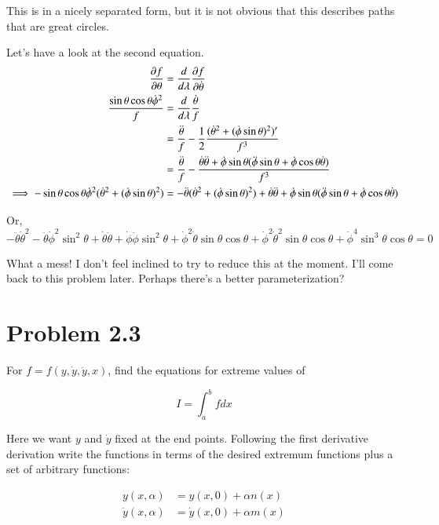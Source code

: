 \documentclass{article}
\newcommand{\ydot}[0]{\dot{y}}
\newcommand{\yddot}[0]{\ddot{y}}
\newcommand{\dottheta}[0]{\dot{\theta}}
\newcommand{\ddottheta}[0]{\ddot{\theta}}
\newcommand{\dotphi}[0]{\dot{\phi}}
\newcommand{\ddotphi}[0]{\ddot{\phi}}
\newcommand{\PD}[2]{\frac{\partial {#2}}{\partial {#1}}}
\begin{document}
This is in a nicely separated form, but it is not obvious that this describes paths that are great circles.

Let's have a look at the second equation.
\begin{align*}
\PD{\theta}{f} &= \frac{d}{d\lambda} \PD{\dottheta}{f} \\
\frac{\sin\theta\cos\theta \dotphi^2}{f}
&= \frac{d}{d\lambda} \frac{\dottheta}{f} \\
&= \frac{\ddottheta}{f} - \inv{2} \frac{ (\dottheta^2 + ( \dotphi \sin\theta )^2 )' }{f^3} \\
&= \frac{\ddottheta}{f} - \frac{ \dottheta \ddottheta + \dotphi \sin\theta ( \ddotphi \sin\theta + \dotphi \cos\theta \dottheta ) }{f^3} \\
\implies
-\sin\theta\cos\theta \dotphi^2 ( \dottheta^2 + ( \dotphi \sin\theta )^2 )
&= -\ddottheta ( \dottheta^2 + ( \dotphi \sin\theta )^2 )
   + \dottheta \ddottheta 
   + \dotphi \sin\theta ( \ddotphi \sin\theta + \dotphi \cos\theta \dottheta ) \\
\end{align*}

Or,
\begin{equation*}
- \ddottheta \dottheta^2 
- \ddottheta \dotphi^2 \sin^2\theta 
+ \dottheta \ddottheta 
+ \dotphi \ddotphi \sin^2\theta
+ \dotphi^2 \dottheta \sin\theta \cos\theta
+ \dotphi^2 \dottheta^2 \sin\theta \cos\theta 
+ \dotphi^4 \sin^3\theta \cos\theta 
= 0
\end{equation*}

What a mess!  I don't feel inclined to try to reduce this at the moment.  I'll come back to this problem later.  Perhaps there's a better parameterization?

\section{ Problem 2.3 }

For $f = f( y, \ydot, \yddot, x )$, find the equations for extreme values of

\begin{equation*}
I = \int_a^b f dx
\end{equation*}

Here we want $y$ and $\ydot$ fixed at the end points.  Following the first derivative derivation write the 
functions in terms of the desired extremum functions plus a set of arbitrary functions:

\begin{align*}
y( x, \alpha ) &= y( x, 0 ) + \alpha n(x) \\
\ydot( x, \alpha ) &= \ydot( x, 0 ) + \alpha m(x)
\end{align*}
\end{document}
